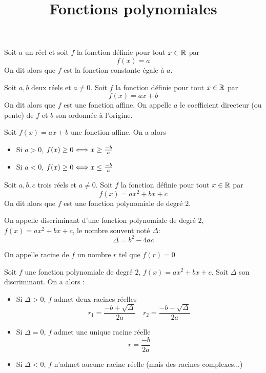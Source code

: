 \documentclass[a4paper, 11pt]{article}
\begin{document}
\title{Fonctions polynomiales}
\begin{defi}
Soit $a$ un réel et soit $f$ la fonction définie pour tout $x\in \mathbb{R}$ par 
$$f(x)= a$$ 
On dit alors que $f$ est la fonction constante égale à $a$.
\end{defi}

\begin{defi}
Soit $a,b$ deux réels  et $a\neq 0$.  Soit $f$ la fonction définie pour tout $x\in \mathbb{R}$ par 
$$f(x)= ax+b$$ 
On dit alors que $f$ est une fonction affine.
On appelle $a$ le coefficient directeur (ou pente) de $f$ et $b$ son ordonnée à l'origine. 
\end{defi}

\begin{prop}
Soit $f(x)=ax+b$ une fonction affine. On a alors 
\begin{itemize}
\item Si $a>0$, $f(x) \geq 0 \Longleftrightarrow x\geq\frac{-b}{a}$
\item Si $a<0$, $f(x) \geq 0 \Longleftrightarrow x\leq\frac{-b}{a}$
\end{itemize}

\end{prop}

\begin{defi}
Soit $a,b,c$ trois réels  et $a\neq 0$.  Soit $f$ la fonction définie pour tout $x\in \mathbb{R}$ par 
$$f(x)= ax^2+bx+c$$ 
On dit alors que $f$ est une fonction polynomiale de degré $2$.
\end{defi}

\begin{defi}
On appelle discriminant d'une fonction polynomiale de degré $2$, $f(x)= ax^2+bx+c$,  le nombre souvent noté $\Delta$: 
$$\Delta = b^2 -4ac$$
\end{defi}
\begin{defi}
On appelle racine de $f$ un nombre $r$ tel que $f(r)=0$
\end{defi}
\begin{prop}
Soit $f$ une fonction polynomiale de degré $2$, $f(x)= ax^2+bx+c$. Soit $\Delta$ son discriminant. On a alors :
\begin{itemize}
\item Si $\Delta>0$, $f$ admet deux racines réelles 
$$r_1 = \frac{-b+\sqrt{\Delta} }{2a} \quad r_2 = \frac{-b-\sqrt{\Delta} }{2a}$$
\item Si $\Delta=0$, $f$ admet une unique racine réelle 
$$r = \frac{-b}{2a} $$
\item Si $\Delta<0$, $f$ n'admet aucune racine réelle (mais des racines complexes...)
\end{itemize}
\end{prop}
\end{document}
